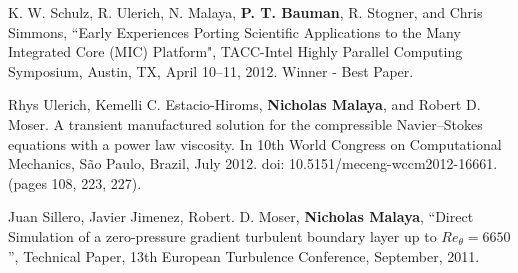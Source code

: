 K. W. Schulz,  R. Ulerich,  N. Malaya, \textbf{P. T. Bauman}, R. Stogner, and Chris Simmons,
``Early Experiences Porting Scientific Applications to the Many Integrated Core (MIC) Platform",
TACC-Intel Highly Parallel Computing Symposium, Austin, TX,
April 10--11, 2012. Winner - Best Paper.

\blankline

Rhys Ulerich, Kemelli C. Estacio-Hiroms, \textbf{Nicholas Malaya}, and Robert D. Moser.
A transient manufactured solution for the compressible Navier–Stokes equations
with a power law viscosity. In 10th World Congress on Computational Mechanics,
São Paulo, Brazil, July 2012. doi: 10.5151/meceng-wccm2012-16661. (pages
108, 223, 227).

\blankline

Juan Sillero, Javier Jimenez, Robert. D. Moser, \textbf{Nicholas Malaya},
``Direct Simulation of a zero-pressure gradient turbulent boundary layer
up to $Re_{\theta}=6650$'', Technical Paper, 13th European Turbulence
Conference, September, 2011.
